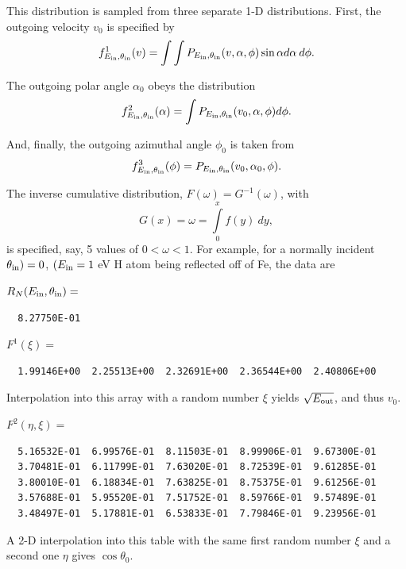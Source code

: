 \documentclass[12pt]{report}
\begin{document}
This distribution is sampled from three separate 1-D distributions. First,
the outgoing velocity $v_{0}$ is specified by
\begin{equation}
f^{1}_{E_{\rm in},\theta_{\rm in}}(v) = \int \int P_{E_{\rm in},\theta_{\rm in}}(v,\alpha,\phi)
\sin \alpha d\alpha \: d \phi.
\end{equation}

The outgoing polar angle $\alpha_{0}$ obeys the distribution
\begin{equation}
f^{2}_{E_{\rm in},\theta_{\rm in}}(\alpha) = \int
P_{E_{\rm in},\theta_{\rm in}}(v_{0},\alpha,\phi) d \phi.
\end{equation}

And, finally, the outgoing azimuthal angle $\phi_{0}$ is taken from
\begin{equation}
f^{3}_{E_{\rm in},\theta_{\rm in}}(\phi) = 
P_{E_{\rm in},\theta_{\rm in}}(v_{0},\alpha_{0},\phi).
\end{equation} 

The inverse cumulative distribution, $F(\omega) = G^{-1}(\omega)$, with
\begin{equation}
G(x) = \omega = \int\limits^{x}_{0} f(y) \: dy,
\end{equation}
is specified, say, 5 values of $0 < \omega < 1$. For example,
for a normally incident $\theta_{\rm in}) = 0$, 
$(E_{\rm in} = 1$ eV H atom being reflected off
of Fe, the data are

$R_{N}(E_{\rm in},\theta_{\rm in}) = $ 
\begin{verbatim}
  8.27750E-01
\end{verbatim}

$F^{1}(\xi) =$ 
\footnotesize
\begin{verbatim} 
  1.99146E+00  2.25513E+00  2.32691E+00  2.36544E+00  2.40806E+00
\end{verbatim}
\normalsize
Interpolation into this array with a random number $\xi$ yields 
$\sqrt{E_{\rm out}}$, and thus $v_{0}$.

$F^{2}(\eta,\xi) =$
\footnotesize
\begin{verbatim} 
  5.16532E-01  6.99576E-01  8.11503E-01  8.99906E-01  9.67300E-01
  3.70481E-01  6.11799E-01  7.63020E-01  8.72539E-01  9.61285E-01
  3.80010E-01  6.18834E-01  7.63825E-01  8.75375E-01  9.61256E-01
  3.57688E-01  5.95520E-01  7.51752E-01  8.59766E-01  9.57489E-01
  3.48497E-01  5.17881E-01  6.53833E-01  7.79846E-01  9.23956E-01
\end{verbatim}
\normalsize
A 2-D interpolation into this table with the same first random number $\xi$
and a second one $\eta$ gives $\cos \theta_{0}$.
\end{document}
